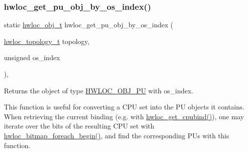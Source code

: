 \subsubsection{\texorpdfstring{hwloc\+\_\+get\+\_\+pu\+\_\+obj\+\_\+by\+\_\+os\+\_\+index()}{hwloc\_get\_pu\_obj\_by\_os\_index()}}
{\footnotesize\ttfamily static \hyperlink{a00185_ga79b8ab56877ef99ac59b833203391c7d}{hwloc\+\_\+obj\+\_\+t} hwloc\+\_\+get\+\_\+pu\+\_\+obj\+\_\+by\+\_\+os\+\_\+index (\begin{DoxyParamCaption}\item[{\hyperlink{a00186_ga9d1e76ee15a7dee158b786c30b6a6e38}{hwloc\+\_\+topology\+\_\+t}}]{topology,  }\item[{unsigned}]{os\+\_\+index }\end{DoxyParamCaption})\hspace{0.3cm}{\ttfamily [inline]}, {\ttfamily [static]}}



Returns the object of type \hyperlink{a00184_ggacd37bb612667dc437d66bfb175a8dc55abca6887e80cb291353b0a0c1da83f661}{H\+W\+L\+O\+C\+\_\+\+O\+B\+J\+\_\+\+PU} with {\ttfamily os\+\_\+index}. 

This function is useful for converting a C\+PU set into the PU objects it contains. When retrieving the current binding (e.\+g. with \hyperlink{a00190_gacba7ecb979baf824d5240fa2cb2a8be6}{hwloc\+\_\+get\+\_\+cpubind()}), one may iterate over the bits of the resulting C\+PU set with \hyperlink{a00205_ga3f6861045a8029ade373510ffa727d2a}{hwloc\+\_\+bitmap\+\_\+foreach\+\_\+begin()}, and find the corresponding P\+Us with this function. 